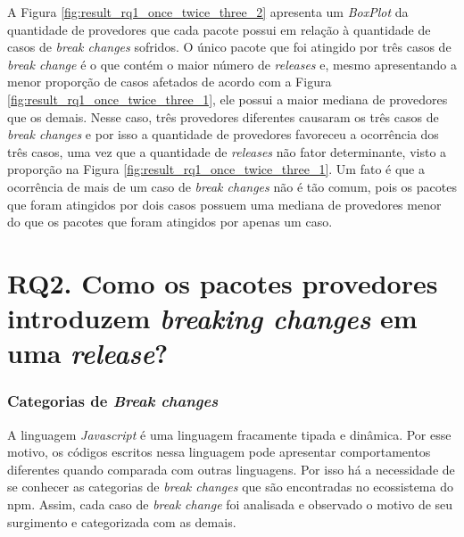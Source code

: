 A Figura \ref{fig:result_rq1_once_twice_three_2} apresenta um  \textit{BoxPlot} da quantidade de provedores que cada pacote possui em relação à quantidade de casos de \textit{break changes} sofridos. O único pacote que foi atingido por três casos de \textit{break change} é o que contém o maior número de \textit{releases} e, mesmo apresentando a menor proporção de casos afetados de acordo com a Figura \ref{fig:result_rq1_once_twice_three_1}, ele possui a maior mediana de provedores que os demais. Nesse caso, três provedores diferentes causaram os três casos de \textit{break changes} e por isso a quantidade de provedores favoreceu a ocorrência dos três casos, uma vez que a quantidade de \textit{releases} não fator determinante, visto a proporção na Figura \ref{fig:result_rq1_once_twice_three_1}.  Um fato é que a ocorrência de mais de um caso de \textit{break changes} não é tão comum, pois os pacotes que foram atingidos por dois casos possuem uma mediana de provedores menor do que os pacotes que foram atingidos por apenas um caso.


\section{RQ2. Como os pacotes provedores introduzem \textit{breaking changes} em uma \textit{release}?}


\subsubsection{Categorias de \textit{Break changes}}
A linguagem \textit{Javascript} é uma linguagem fracamente tipada e dinâmica. Por esse motivo, os códigos escritos nessa linguagem pode apresentar comportamentos diferentes quando comparada com outras linguagens. Por isso há a necessidade de se conhecer as  categorias de \textit{break changes} que são encontradas no ecossistema do \gls{npm}. Assim, cada caso de \textit{break change} foi analisada e observado o motivo de seu surgimento e categorizada com as demais. 

